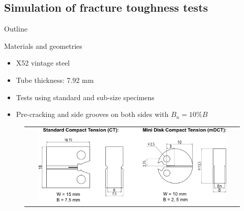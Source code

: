 \documentclass[9pt]{beamer}
\begin{document}

\subsection{Simulation of fracture toughness tests}

\begin{frame}{Outline}
	\tableofcontents[ 
    currentsubsection, 
    hideothersubsections, 
    sectionstyle=show/shaded, 
    subsectionstyle=show/shaded, 
    ] 
\end{frame}


\begin{frame}{Materials and geometries}

    \begin{itemize}
        \item X52 vintage steel
        \vspace{0.15cm}
        \item Tube thickness: 7.92 mm
        \vspace{0.15cm}
        \item Tests using standard and sub-size specimens
        \vspace{0.15cm}
        \item Pre-cracking and side grooves on both sides with $B_n = 10\%B$
    \end{itemize}
    
    \vspace{0.25cm}

    \begin{figure}
        \begin{tabular}{c}
            \includegraphics[width=0.9\textwidth]{Images/CT_mDCT_specimens_X52.pdf} \\
        \end{tabular}
    \end{figure}

\end{frame}
\end{document}
